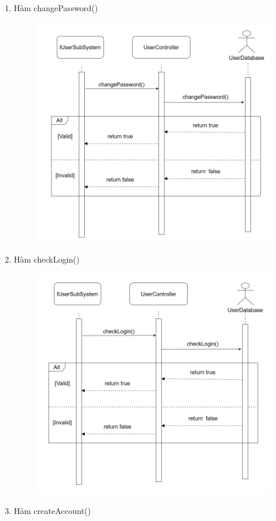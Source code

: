     \begin{enumerate}
        \item Hàm changePassword()
        \begin{figure}[H]
        \centering
        \includegraphics[width=0.7\linewidth]{img3.5/user/changePassword.png}
        \end{figure}
        \item Hàm checkLogin()
        \begin{figure}[H]
        \centering
        \includegraphics[width=0.8\linewidth]{img3.5/user/checkLogin.png} 
        \end{figure}
        \item Hàm createAccount()
        \begin{figure}[H]
        \centering

\end{figure}
\end{enumerate}

